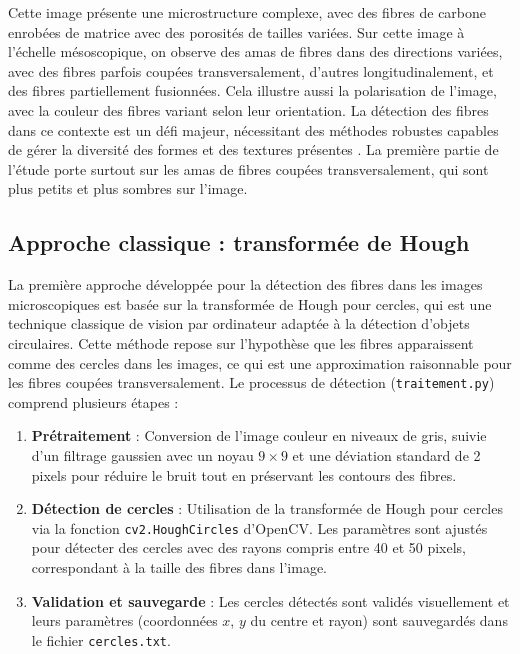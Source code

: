 \documentclass[a4paper,11pt]{article}
\begin{document}
Cette image présente une microstructure complexe, avec des fibres de carbone enrobées de matrice avec des porosités de tailles variées. Sur cette image à l'échelle mésoscopique, on observe des amas de fibres dans des directions variées, avec des fibres parfois coupées transversalement, d'autres longitudinalement, et des fibres partiellement fusionnées. Cela illustre aussi la polarisation de l'image, avec la couleur des fibres variant selon leur orientation. La détection des fibres dans ce contexte est un défi majeur, nécessitant des méthodes robustes capables de gérer la diversité des formes et des textures présentes \cite{CharronCC}. La première partie de l'étude porte surtout sur les amas de fibres coupées transversalement, qui sont plus petits et plus sombres sur l'image.

\subsection{Approche classique : transformée de Hough}

La première approche développée pour la détection des fibres dans les images microscopiques est basée sur la transformée de Hough pour cercles, qui est une technique classique de vision par ordinateur adaptée à la détection d'objets circulaires. Cette méthode repose sur l'hypothèse que les fibres apparaissent comme des cercles dans les images, ce qui est une approximation raisonnable pour les fibres coupées transversalement. Le processus de détection (\texttt{traitement.py}) comprend plusieurs étapes :

\begin{enumerate}
    \item \textbf{Prétraitement} : Conversion de l'image couleur en niveaux de gris, suivie d'un filtrage gaussien avec un noyau $9\times9$ et une déviation standard de 2 pixels pour réduire le bruit tout en préservant les contours des fibres.

    \item \textbf{Détection de cercles} : Utilisation de la transformée de Hough pour cercles via la fonction \texttt{cv2.HoughCircles} d'OpenCV. Les paramètres sont ajustés pour détecter des cercles avec des rayons compris entre 40 et 50 pixels, correspondant à la taille des fibres dans l'image.

    \item \textbf{Validation et sauvegarde} : Les cercles détectés sont validés visuellement et leurs paramètres (coordonnées $x$, $y$ du centre et rayon) sont sauvegardés dans le fichier \texttt{cercles.txt}.
\end{enumerate}
\end{document}

